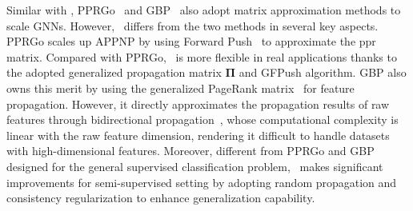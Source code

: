 Similar with \model,  PPRGo~\cite{bojchevski2020scaling} and GBP~\cite{chen2020scalable} also adopt matrix approximation methods to scale GNNs. However, \model\ differs from the two methods in several key aspects. PPRGo scales up APPNP by using Forward Push~\cite{andersen2006local} to approximate the ppr matrix. Compared with PPRGo, \model\ is more flexible in real applications thanks to the adopted generalized propagation matrix $\mathbf{\Pi}$ and GFPush algorithm. GBP also owns this merit by using the generalized PageRank matrix~\cite{li2019optimizing} for feature propagation. However, it directly approximates the propagation results of raw features through bidirectional propagation~\cite{banerjee2015fast}, whose computational complexity is linear with the raw feature dimension, rendering it difficult to handle datasets with high-dimensional features.
Moreover, different from PPRGo and GBP designed for the general supervised classification problem,  \model\ makes significant improvements for semi-supervised setting by adopting random propagation and consistency regularization to enhance generalization capability.


 
 
 
 
 
 



